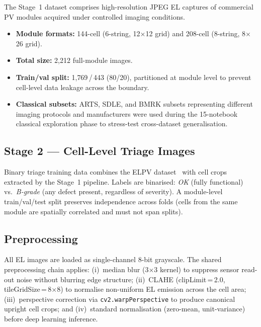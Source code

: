 \documentclass[conference]{IEEEtran}
\begin{document}
The Stage~1 dataset comprises high-resolution JPEG EL
captures of commercial PV modules acquired under controlled
imaging conditions.
\begin{itemize}
  \item \textbf{Module formats:} 144-cell (6-string,
        12$\times$12 grid) and 208-cell (8-string,
        8$\times$26 grid).
  \item \textbf{Total size:} 2{,}212 full-module images.
  \item \textbf{Train/val split:} 1{,}769\,/\,443 (80/20),
        partitioned at module level to prevent cell-level
        data leakage across the boundary.
  \item \textbf{Classical subsets:} ARTS, SDLE, and BMRK
        subsets representing different imaging protocols and
        manufacturers were used during the 15-notebook classical
        exploration phase to stress-test cross-dataset
        generalisation.
\end{itemize}

\subsection{Stage 2 --- Cell-Level Triage Images}

Binary triage training data combines the ELPV
dataset~\cite{deitsch2019} with cell crops extracted by
the Stage~1 pipeline.
Labels are binarised: \textit{OK} (fully functional) vs.\
\textit{B-grade} (any defect present, regardless of severity).
A module-level train/val/test split preserves independence
across folds (cells from the same module are spatially
correlated and must not span splits).

\subsection{Preprocessing}
All EL images are loaded as single-channel 8-bit grayscale.
The shared preprocessing chain applies:
(i)~median blur (3$\times$3 kernel) to suppress sensor
read-out noise without blurring edge structure;
(ii)~CLAHE (clipLimit\,=\,2.0, tileGridSize\,=\,8$\times$8)
to normalise non-uniform EL emission across the cell area;
(iii)~perspective correction via
\texttt{cv2.warpPerspective} to produce canonical upright
cell crops; and
(iv)~standard normalisation (zero-mean, unit-variance)
before deep learning inference.

\end{document}
